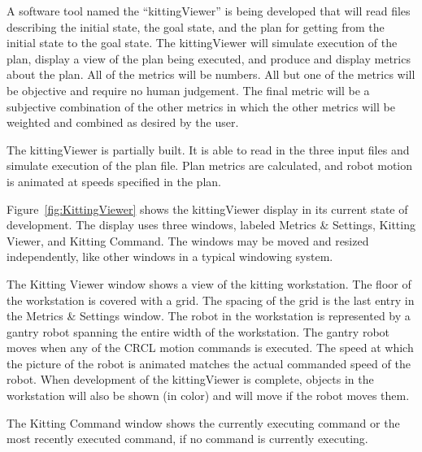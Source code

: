 A software tool named the ``kittingViewer'' is being developed that will
read files describing the initial state, the goal state, and the plan for
getting from the initial state to the goal state. The kittingViewer will
simulate execution of the plan, display a view of the plan being executed,
and produce and display metrics about the plan.  All of the metrics will be
numbers. All but one of the metrics will be objective and require no human
judgement. The final metric will be a subjective combination of the other
metrics in which the other metrics will be weighted and combined as desired
by the user.

The kittingViewer is partially built. It is able to read in the three
input files and simulate execution of the plan file. Plan metrics are
calculated, and robot motion is animated at speeds specified
in the plan.

Figure~\ref{fig:KittingViewer} shows the kittingViewer display in its
current state of development. The display uses three windows, labeled
Metrics \& Settings, Kitting Viewer, and Kitting Command. The windows may
be moved and resized independently, like other windows in a typical
windowing system. 

The Kitting Viewer window shows a view of the kitting workstation. The
floor of the workstation is covered with a grid. The spacing of the grid is
the last entry in the Metrics \& Settings window. The robot in the
workstation is represented by a gantry robot spanning the entire width of
the workstation.  The gantry robot moves when any of the CRCL motion
commands is executed.  The speed at which the picture of the robot is
animated matches the actual commanded speed of the robot.  When development
of the kittingViewer is complete, objects in the workstation will also be
shown (in color) and will move if the robot moves them.

The Kitting Command window shows the currently executing command or the
most recently executed command, if no command is currently executing.


